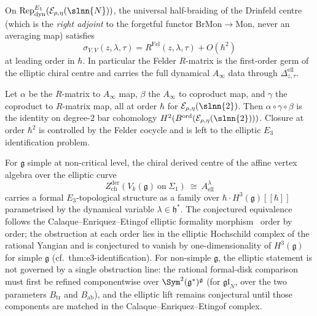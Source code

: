 \begin{theorem}
\label{thm:felder-R-half-braiding}
\ClaimStatusProvedHere
On $\mathrm{Rep}^{E_1}_{\mathrm{dyn}}(\mathcal E_{\rho,\eta}
(\slnn{N}))$, the universal half-braiding of the Drinfeld centre
(which is the \emph{right adjoint} to the forgetful functor
$\mathrm{BrMon}\to\mathrm{Mon}$, never an averaging
map) satisfies
\[
\sigma_{V,V}(z,\lambda,\tau) = R^{\mathrm{Fel}}(z,\lambda,\tau)
+ O(\hbar^2)
\]
at leading order in $\hbar$. In particular the Felder
$R$-matrix is the first-order germ of the elliptic chiral
centre and carries the full dynamical $A_\infty$ data through
$\Delta^{\mathrm{ell}}_{z,\tau}$.
\end{theorem}

\begin{proposition}
\label{prop:sl2-elliptic-yangian-triangle}
\ClaimStatusProvedHere
Let $\alpha$ be the $R$-matrix to $A_\infty$ map, $\beta$ the
$A_\infty$ to coproduct map, and $\gamma$ the coproduct to
$R$-matrix map, all at order $\hbar$ for
$\mathcal E_{\rho,\eta}(\slnn{2})$. Then $\alpha\circ\gamma\circ
\beta$ is the identity on degree-$2$ bar cohomology
$H^2(B^{\mathrm{ord}}(\mathcal E_{\rho,\eta}(\slnn{2})))$.
Closure at order $\hbar^2$ is controlled by the Felder cocycle and
is left to the elliptic $E_3$ identification problem.
\end{proposition}

\begin{conjecture}
\label{conj:elliptic-E3-identification}
\ClaimStatusConjectured
For $\mathfrak g$ simple at non-critical level, the chiral derived
centre of the affine vertex algebra over the elliptic curve
\[
Z^{\mathrm{der}}_{\mathrm{ch}}(V_k(\mathfrak g)\ \text{on}\ \Sigma_1)
\ \cong\ A^\lambda_{\mathrm{ell}}
\]
carries a formal $E_3$-topological structure as a family over
$\hbar\cdot H^3(\mathfrak g)[[\hbar]]$ parametrised by the dynamical
variable $\lambda \in \mathfrak h^*$. The conjectured equivalence
follows the Calaque--Enriquez--Etingof elliptic formality
morphism~\cite{CEE09} order by order; the obstruction at each
order lies in the elliptic Hochschild complex of the rational
Yangian and is conjectured to vanish by one-dimensionality of
$H^3(\mathfrak g)$ for simple $\mathfrak g$
(cf.\ thm:e3-identification). For non-simple $\mathfrak g$,
the elliptic statement is not governed by a single obstruction
line: the rational formal-disk comparison must first be refined
componentwise over $\Sym^2(\mathfrak g^*)^{\mathfrak g}$
(for $\mathfrak{gl}_N$, over the two parameters
$B_{\mathrm{tr}}$ and $B_{\mathrm{ab}}$), and the elliptic
lift remains conjectural until those components are matched in
the Calaque--Enriquez--Etingof complex.
\end{conjecture}

